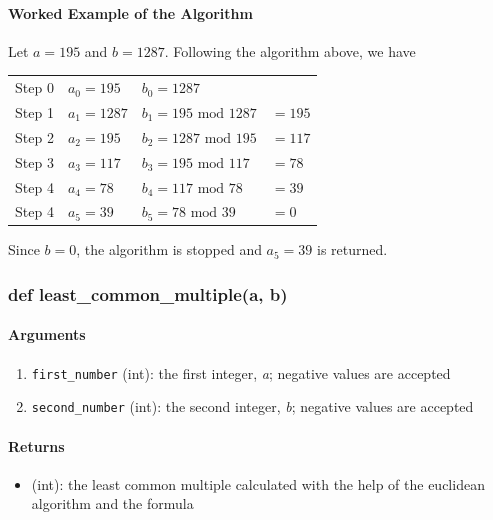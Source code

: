 \documentclass[refman]{scrartcl}
\newcommand{\mymod}{\text{\ \ mod\ \ }}
\begin{document}
\paragraph*{Worked Example of the Algorithm}

Let \(a = 195\) and \(b = 1287\). Following the algorithm above, we have
%
\begin{center}
	\begin{tabular}{ l l l l }
	 Step 0 & \(a_0 = 195\) & \(b_0 = 1287\) & \\ 
	 Step 1 & \(a_1 = 1287\) & \(b_1 = 195 \mymod 1287\) & \(= 195\) \\  
	 Step 2 & \(a_2 = 195\) & \(b_2 = 1287 \mymod 195\) & \(= 117\) \\
	 Step 3 & \(a_3 = 117 \) & \(b_3 = 195 \mymod 117\) & \(= 78\) \\
	 Step 4 & \(a_4 = 78\) & \(b_4 = 117 \mymod 78\) & \(= 39\)\\
	 Step 4 & \(a_5 = 39\) & \(b_5 = 78 \mymod 39\) & \(= 0\)
	\end{tabular}
\end{center}
%
Since \(b = 0\), the algorithm is stopped and \(a_5 = 39\) is returned.

\subsubsection{def least\_common\_multiple(a, b)}

\paragraph*{Arguments}

\begin{enumerate}
  \item \texttt{first\_number} (int): the first integer, \textit{a}; negative values are accepted
  \item \texttt{second\_number} (int): the second integer, \textit{b}; negative values are accepted
\end{enumerate}

\paragraph*{Returns}

\begin{itemize}
  \item (int): the least common multiple calculated with the help of the euclidean algorithm and the formula
\end{itemize}
\end{document}
